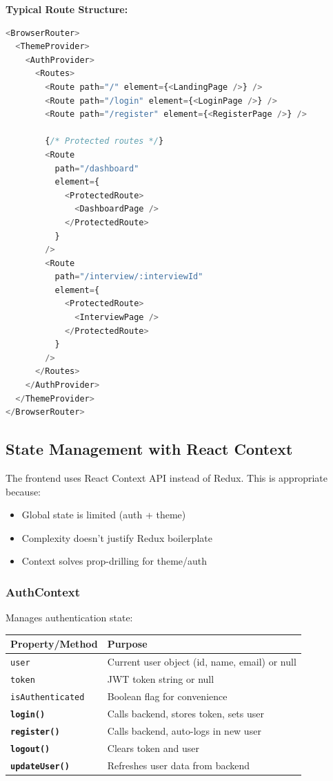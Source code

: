 \documentclass[12pt,a4paper,oneside]{article}
\newcommand{\funcname}[1]{\texttt{\textbf{#1}}}
\newcommand{\varname}[1]{\texttt{#1}}
\begin{document}
\textbf{Typical Route Structure:}

\begin{lstlisting}[language=JavaScript, caption=Route Configuration Pattern]
<BrowserRouter>
  <ThemeProvider>
    <AuthProvider>
      <Routes>
        <Route path="/" element={<LandingPage />} />
        <Route path="/login" element={<LoginPage />} />
        <Route path="/register" element={<RegisterPage />} />
        
        {/* Protected routes */}
        <Route 
          path="/dashboard" 
          element={
            <ProtectedRoute>
              <DashboardPage />
            </ProtectedRoute>
          } 
        />
        <Route 
          path="/interview/:interviewId" 
          element={
            <ProtectedRoute>
              <InterviewPage />
            </ProtectedRoute>
          } 
        />
      </Routes>
    </AuthProvider>
  </ThemeProvider>
</BrowserRouter>
\end{lstlisting}

\subsection{State Management with React Context}

The frontend uses React Context API instead of Redux. This is appropriate because:

\begin{itemize}
    \item Global state is limited (auth + theme)
    \item Complexity doesn't justify Redux boilerplate
    \item Context solves prop-drilling for theme/auth
\end{itemize}

\subsubsection{AuthContext}

Manages authentication state:

\begin{table}[H]
\centering
\begin{tabular}{|p{3cm}|p{11cm}|}
\hline
\textbf{Property/Method} & \textbf{Purpose} \\
\hline
\varname{user} & Current user object (id, name, email) or null \\
\hline
\varname{token} & JWT token string or null \\
\hline
\varname{isAuthenticated} & Boolean flag for convenience \\
\hline
\funcname{login()} & Calls backend, stores token, sets user \\
\hline
\funcname{register()} & Calls backend, auto-logs in new user \\
\hline
\funcname{logout()} & Clears token and user \\
\hline
\funcname{updateUser()} & Refreshes user data from backend \\
\hline
\end{tabular}
\end{table}
\end{document}
